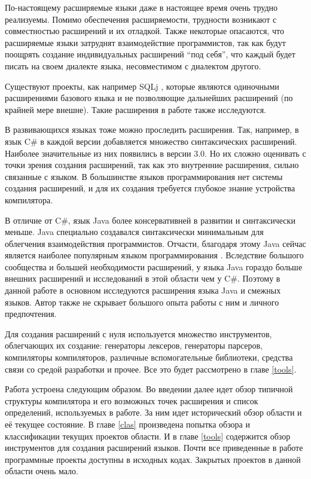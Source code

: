 \documentclass[a4paper,12pt,titlepage]{extarticle}
\begin{document}
По-настоящему расширяемые языки даже в настоящее время очень трудно
реализуемы. Помимо обеспечения расширяемости, трудности возникают с
совместностью расширений и их отладкой. Также некоторые опасаются, что
расширяемые языки затруднят взаимодействие программистов, так как будут
поощрять создание индивидуальных расширений ``под себя'', что каждый будет
писать на своем диалекте языка, несовместимом с диалектом другого.

Существуют проекты, как например SQLj \cite{sqlj}, которые являются одиночными
расширениями базового языка и не позволяющие дальнейших расширений (по
крайней мере внешне). Такие расширения в работе также исследуются.

В развивающихся языках тоже можно проследить расширения. Так, например, в язык
C\# в каждой версии добавляется множество синтаксических расширений. Наиболее
значительные из них появились в версии 3.0. Но их сложно оценивать с точки
зрения создания расширений, так как это внутренние расширения, сильно связанные
с языком. В большинстве языков программирования нет системы создания
расширений, и для их создания требуется глубокое знание устройства компилятора.

В отличие от C\#, язык Java более консервативней в развитии и синтаксически
меньше. Java специально создавался синтаксически минимальным для облегчения
взаимодействия программистов. Отчасти, благодаря этому Java сейчас
является наиболее популярным языком программирования \cite{tiobe}. Вследствие 
большого сообщества и большей необходимости расширений, у языка Java
гораздо больше внешних расширений и исследований в этой области чем у C\#.
Поэтому в данной работе в основном исследуются расширения языка Java и смежных
языков. Автор также не скрывает большого опыта работы с ним и личного
предпочтения.

Для создания расширений с нуля используется множество инструментов, облегчающих
их создание: генераторы лексеров, генераторы парсеров, компиляторы
компиляторов, различные вспомогательные библиотеки, средства связи со средой
разработки и прочее. Все это будет рассмотрено в главе \ref{tools}.

Работа устроена следующим образом. Во введении далее идет обзор типичной
структуры компилятора и его возможных точек расширения и список определений,
используемых в работе. За ним идет исторический обзор области и её текущее
состояние. В главе \ref{clas} произведена попытка обзора и классификации текущих
проектов области. И в главе \ref{tools} содержится обзор инструментов для
создания расширений языков. Почти все приведенные в работе программные проекты
доступны в исходных кодах. Закрытых проектов в данной области очень мало.
\end{document}
